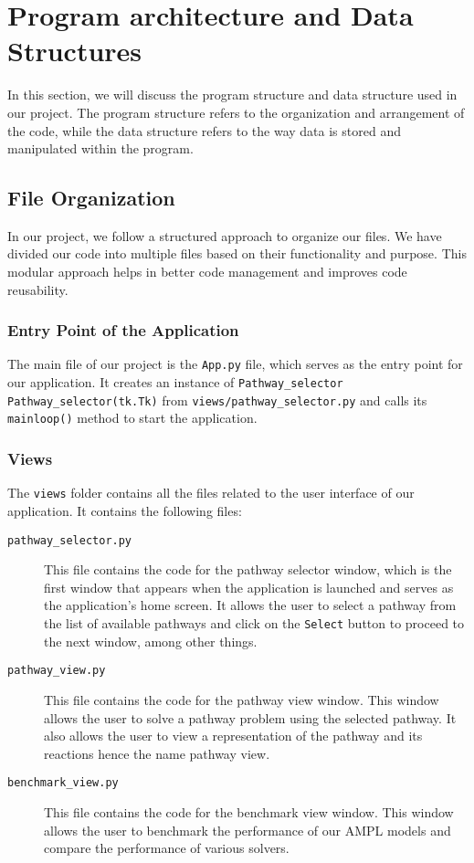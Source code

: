 \section{Program architecture and Data Structures}
\label{sec:program_structure}

In this section, we will discuss the program structure and data structure used in our project. The program structure refers to the organization and arrangement of the code, while the data structure refers to the way data is stored and manipulated within the program.

\subsection{File Organization}
\label{subsec:file_organization}

In our project, we follow a structured approach to organize our files. 
We have divided our code into multiple files based on their functionality and purpose. 
This modular approach helps in better code management and improves code reusability.

\subsubsection{Entry Point of the Application}

The main file of our project is the \texttt{App.py} file, which serves as the entry point for our application. 
It creates an instance of \texttt{Pathway\_selector} \texttt{Pathway\_selector(tk.Tk)} from \texttt{views/pathway\_selector.py} and calls its \texttt{mainloop()} method to start the application.

\subsubsection{Views}

The \texttt{views} folder contains all the files related to the user interface of our application.
It contains the following files:

\begin{description}
    \item[\texttt{pathway\_selector.py}] This file contains the code for the pathway selector window, which is the first window that appears when the application is launched and serves as the application's home screen. It allows the user to select a pathway from the list of available pathways and click on the \texttt{Select} button to proceed to the next window, among other things.
    \item[\texttt{pathway\_view.py}] This file contains the code for the pathway view window. This window allows the user to solve a pathway problem using the selected pathway. It also allows the user to view a representation of the pathway and its reactions hence the name pathway view.
    \item[\texttt{benchmark\_view.py}] This file contains the code for the benchmark view window. This window allows the user to benchmark the performance of our AMPL models and compare the performance of various solvers.
\end{description}

